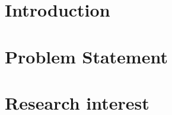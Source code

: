 \section{Introduction}

\newpage
\section{Problem Statement}

\newpage
\section{Research interest}


